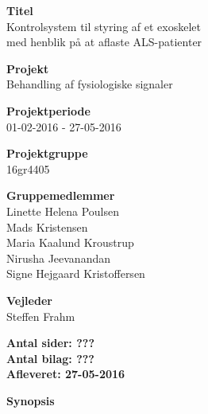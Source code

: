 \begin{minipage}[t]{0.48\textwidth}
\textbf{Titel} \\[5pt]\hspace*{2ex} 
Kontrolsystem til styring af et exoskelet \\\bigskip\hspace*{2ex}
med henblik på at aflaste ALS-patienter

 

\textbf{Projekt} \\[5pt]\bigskip\hspace*{2ex}
Behandling af fysiologiske signaler%

\textbf{Projektperiode} \\[5pt]\bigskip\hspace{2ex}
01-02-2016 - 27-05-2016

\textbf{Projektgruppe} \\[5pt]\bigskip\hspace{2ex}
16gr4405

\textbf{Gruppemedlemmer} \\[5pt]\hspace*{2ex}
Linette Helena Poulsen \\\hspace*{2ex}
Mads Kristensen \\\hspace*{2ex}
Maria Kaalund Kroustrup \\\hspace*{2ex}
Nirusha Jeevanandan \\\bigskip\hspace*{2ex}
Signe Hejgaard Kristoffersen %


\textbf{Vejleder} \\[5pt]\bigskip\hspace*{2ex}
Steffen Frahm %


\vspace*{1cm}

\textbf{Antal sider: ???} \\
\textbf{Antal bilag: ???} \\ 
\textbf{Afleveret: 27-05-2016}

\end{minipage}
\hfill
\begin{minipage}[t]{0.483\textwidth}
\textbf{Synopsis} \\[5pt]
\fbox{\parbox{8cm}{\bigskip\bigskip}}
\end{minipage}


